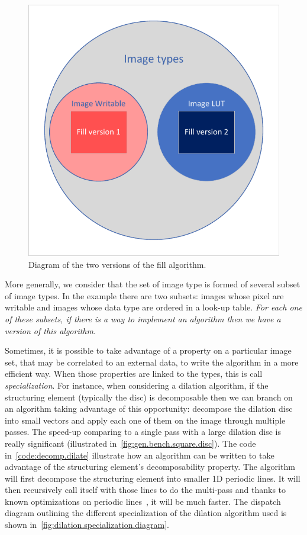 \begin{figure}[htbp]
  \centering
  \includegraphics[width=.5\linewidth]{figs/fill_version_diagram.pdf}
  \caption{Diagram of the two versions of the fill algorithm.}
  \label{fig:fill.version.diagram}
\end{figure}

More generally, we consider that the set of image type is formed of several subset of image types. In the example there
are two subsets: images whose pixel are writable and images whose data type are ordered in a look-up table. \emph{For
  each one of these subsets, if there is a way to implement an algorithm then we have a \emph{version} of this algorithm}.

Sometimes, it is possible to take advantage of a property on a particular image set, that may be correlated to an
external data, to write the algorithm in a more efficient way. When those properties are linked to the types, this is
call \emph{specialization}. For instance, when considering a dilation algorithm, if the structuring element (typically
the disc) is decomposable then we can branch on an algorithm taking advantage of this opportunity: decompose the
dilation disc into small vectors and apply each one of them on the image through multiple passes. The speed-up comparing
to a single pass with a large dilation disc is really significant (illustrated in~\ref{fig:gen.bench.square.disc}). The
code in~\ref{code:decomp.dilate} illustrate how an algorithm can be written to take advantage of the structuring
element's decomposability property. The algorithm will first decompose the structuring element into smaller 1D periodic
lines. It will then recursively call itself with those lines to do the multi-pass and thanks to known optimizations on
periodic lines~\cite{vanherk.1992.localminmax}, it will be much faster. The dispatch diagram outlining the different
specialization of the dilation algorithm used is shown in~\cref{fig:dilation.specialization.diagram}.

